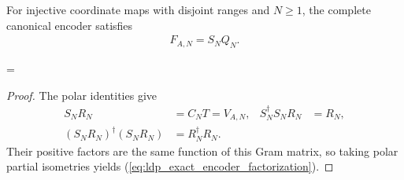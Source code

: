 \begin{lemma}
    \label{thm:ldp_exact_encoder_factorization}
    \leanok
    For injective coordinate maps with disjoint ranges and $N\ge1$,
    the complete canonical encoder satisfies
    \begin{align}
        F_{A,N}=S_NQ_N.
        \label{eq:ldp_exact_encoder_factorization}
    \end{align}

    \begin{center}
        \tenkzkernel
        \begin{tenkzequation}
            \begin{tenkz}[rows={wire}, cols=1, bonds=none]
            \end{tenkz}
            =
            \begin{tenkz}[rows={wire,wire}, cols=1, bonds=none]
            \end{tenkz}
        \end{tenkzequation}
    \end{center}
\end{lemma}
\begin{proof}\leanok
    The polar identities give
    \begin{align*}
        S_NR_N                   & =C_NT=V_{A,N},    & S_N^\dagger S_NR_N & =R_N, \\
        (S_NR_N)^\dagger(S_NR_N) & =R_N^\dagger R_N.
    \end{align*}
    Their positive factors are the same function of this Gram matrix,
    so taking polar partial isometries yields
    (\ref{eq:ldp_exact_encoder_factorization}).
\end{proof}

